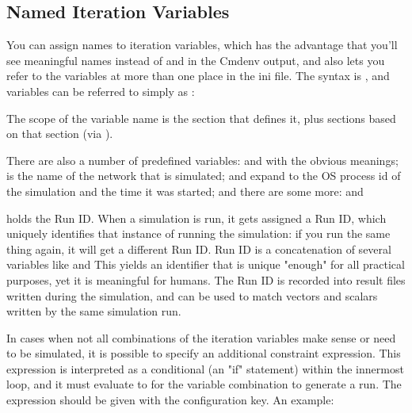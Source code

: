 \subsection{Named Iteration Variables}

You can assign names to iteration variables, which has the advantage
that you'll see meaningful names instead of  and
 in the Cmdenv output, and also lets you refer to the variables at
more than one place in the ini file. The syntax is
, and variables can be referred to simply as
:


The scope of the variable name is the section that defines it, plus
sections based on that section (via ).

There are also a number of predefined variables:  and
 with the obvious meanings;  is the name of
the network that is simulated;  and 
expand to the OS process id of the simulation and the time it was
started; and there are some more:   and

 holds the Run ID. When a simulation is run, it gets assigned
a Run ID, which uniquely identifies that instance of running the
simulation: if you run the same thing again, it will get a different
Run ID. Run ID is a concatenation of several variables like
   and 
This yields an identifier that is unique
"enough" for all practical purposes, yet it
is meaningful for humans. The Run ID is recorded into result files
written during the simulation, and can be used to match vectors and
scalars written by the same simulation run.

In cases when not all combinations of the iteration variables make sense
or need to be simulated, it is possible to specify an additional
constraint expression. This expression is interpreted as a conditional
(an "if" statement) within the innermost
loop, and it must evaluate to  for
the variable combination to generate a run. The expression should be
given with the  configuration key. An example:


